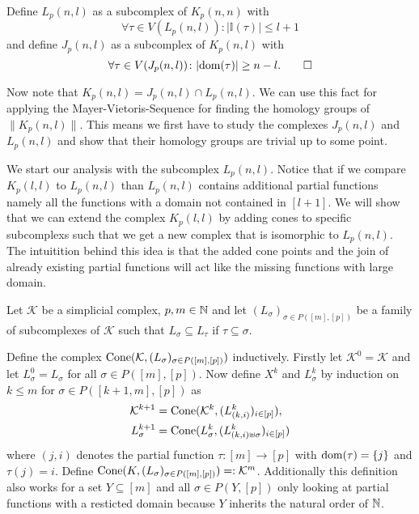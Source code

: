 \begin{defin}
  Define $L_p(n,l)$ as a subcomplex of $K_p(n,n)$ with \[\forall\tau\in V(L_p(n,l))\colon |\mathbb{I}(\tau)| \leq l+1 \]
  and define $J_p(n,l)$ as a subcomplex of $K_p(n,l)$ with \[\forall \tau \in V(J_p(n,l))\colon |{\rm dom}(\tau)| \geq n-l.\qedhere\]
\end{defin}

Now note that $K_p(n,l) = J_p(n,l) \cap L_p(n,l)$. We can use this fact for applying the Mayer-Vietoris-Sequence for finding the homology groups of $\lVert K_p(n,l)\rVert$. This means we first have to study the complexes $J_p(n,l)$ and $L_p(n,l)$ and show that their homology groups are trivial up to some point.

We start our analysis with the subcomplex $L_p(n,l)$. Notice that if we compare $K_p(l,l)$ to $L_p(n,l)$ than $L_p(n,l)$ contains additional partial functions namely all the functions with a domain not contained in $[l+1]$. We will show that we can extend the complex $K_p(l,l)$ by adding cones to specific subcomplexs such that we get a new complex that is isomorphic to $L_p(n,l)$. The intuitition behind this idea is that the added cone points and the join of already existing partial functions will act like the missing functions with large domain. 

\begin{defin}
  Let $\mathcal{K}$ be a simplicial complex, $p,m \in \mathbb{N}$ and let $(L_\sigma)_{\sigma \in P([m],[p])}$ be a family of subcomplexes of $\mathcal{K}$ such that $L_\sigma \subseteq L_\tau$ if $\tau \subseteq \sigma$.

  Define the complex ${\rm Cone}(\mathcal{K}, (L_\sigma)_{\sigma\in P([m],[p])})$ inductively. Firstly let $\mathcal{K}^0 = \mathcal{K}$ and let $L_\sigma^0 = L_\sigma$ for all $\sigma \in P([m],[p])$. Now define $X^k$ and $L_\sigma^k$ by induction on $k \leq m$ for $\sigma \in P([k+1,m], [p])$ as
  \begin{align*}
    \mathcal{K}^{k+1} &= {\rm Cone}(\mathcal{K}^k, (L^k_{(k,i)})_{i\in [p]}), \\
    L^{k+1}_\sigma &= {\rm Cone}(L^k_\sigma, (L^k_{(k,i) \uplus \sigma})_{i\in [p]})
  \end{align*}
  where $(j,i)$ denotes the partial function $\tau\colon [m] \to [p]$ with ${\rm dom}(\tau) = \{j\}$ and $\tau(j) = i$. Define ${\rm Cone}(K, (L_\sigma)_{\sigma \in P([m],[p])}) =: \mathcal{K}^m$.
  Additionally this definition also works for a set $Y \subseteq [m]$ and all $\sigma \in P(Y, [p])$ only looking at partial functions with a resticted domain because $Y$ inherits the natural order of $\mathbb{N}$.
\end{defin}


